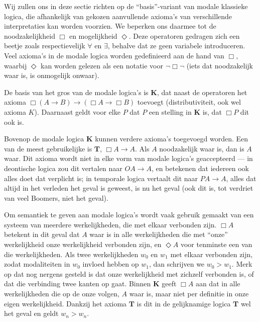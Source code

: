 Wij zullen ons in deze sectie richten op de \enquote{basis}-variant van modale klassieke logica, die afhankelijk van gekozen aanvullende axioma's van verschillende interpretaties kan worden voorzien. We beperken ons daarmee tot de noodzakelijkheid $\Box$ en mogelijkheid $\Diamond$. Deze operatoren gedragen zich een beetje zoals respectievelijk $\forall$ en $\exists$, behalve dat ze geen variabele introduceren. Veel axioma's in de modale logica worden gedefinieerd aan de hand van $\Box$, waarbij $\Diamond$ kan worden gelezen als een notatie voor $\neg \Box \neg$ (iets dat noodzakelijk waar is, is onmogelijk onwaar).

De basis van het gros van de modale logica's is $\mathbf{K}$, dat naast de operatoren het axioma $\Box (A \to B) \to (\Box A \to \Box B)$ toevoegt (distributiviteit, ook wel axioma $K$). Daarnaast geldt voor elke $P$ dat $P$ een stelling in $\mathbf{K}$ is, dat $\Box P$ dit ook is.

Bovenop de modale logica $\mathbf{K}$ kunnen verdere axioma's toegevoegd worden. Een van de meest gebruikelijke is $\mathbf{T}$, $\Box A \to A$. Als $A$ noodzakelijk waar is, dan is $A$ waar. Dit axioma wordt niet in elke vorm van modale logica's geaccepteerd --- in deontische logica zou dit vertalen naar $OA \to A$, en betekenen dat iedereen ook alles doet dat verplicht is; in temporale logica vertaalt dit naar $PA \to A$, alles dat altijd in het verleden het geval is geweest, is nu het geval (ook dit is, tot verdriet van veel Boomers, niet het geval).

Om semantiek te geven aan modale logica's wordt vaak gebruik gemaakt van een systeem van meerdere werkelijkheden, die met elkaar verbonden zijn. $\Box A$ betekent in dit geval dat $A$ waar is in alle werkelijkheden die met \enquote{onze} werkelijkheid onze werkelijkheid verbonden zijn, en $\Diamond A$ voor tenminste een van die werkelijkheden. Als twee werkelijkheden $w_0$ en $w_1$ met elkaar verbonden zijn, zodat modaliteiten in $w_0$ invloed hebben op $w_1$, dan schrijven we $w_0 > w_1$. Merk op dat nog nergens gesteld is dat onze werkelijkheid met zichzelf verbonden is, of dat die verbinding twee kanten op gaat. Binnen $\mathbf{K}$ geeft $\Box A$ aan dat in alle werkelijkheden die op de onze volgen, $A$ waar is, maar niet per definitie in onze eigen werkelijkheid. Dankzij het axioma $\mathbf{T}$ is dit in de gelijknamige logica $\mathbf{T}$ wel het geval en geldt $w_n > w_n$.

